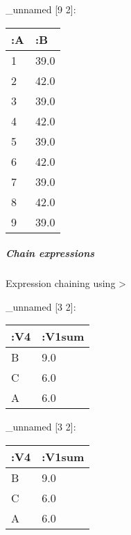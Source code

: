 \documentclass[]{article}
\newenvironment{Shaded}{\begin{snugshade}}{\end{snugshade}}
\newcommand{\AttributeTok}[1]{\textcolor[rgb]{0.77,0.63,0.00}{#1}}
\newcommand{\DecValTok}[1]{\textcolor[rgb]{0.00,0.00,0.81}{#1}}
\newcommand{\KeywordTok}[1]{\textcolor[rgb]{0.13,0.29,0.53}{\textbf{#1}}}
\newcommand{\NormalTok}[1]{#1}
\newcommand{\VariableTok}[1]{\textcolor[rgb]{0.00,0.00,0.00}{#1}}
\let\oldsubparagraph\subparagraph
\renewcommand{\subparagraph}[1]{\oldsubparagraph{#1}\mbox{}}
\begin{document}
\_unnamed {[}9 2{]}:

\begin{longtable}[]{@{}ll@{}}
\toprule
:A & :B\tabularnewline
\midrule
\endhead
1 & 39.0\tabularnewline
2 & 42.0\tabularnewline
3 & 39.0\tabularnewline
4 & 42.0\tabularnewline
5 & 39.0\tabularnewline
6 & 42.0\tabularnewline
7 & 39.0\tabularnewline
8 & 42.0\tabularnewline
9 & 39.0\tabularnewline
\bottomrule
\end{longtable}

\hypertarget{chain-expressions}{%
\subparagraph{Chain expressions}\label{chain-expressions}}

Expression chaining using \textgreater{}

\begin{Shaded}
\end{Shaded}

\_unnamed {[}3 2{]}:

\begin{longtable}[]{@{}ll@{}}
\toprule
:V4 & :V1sum\tabularnewline
\midrule
\endhead
B & 9.0\tabularnewline
C & 6.0\tabularnewline
A & 6.0\tabularnewline
\bottomrule
\end{longtable}

\begin{Shaded}
\end{Shaded}

\_unnamed {[}3 2{]}:

\begin{longtable}[]{@{}ll@{}}
\toprule
:V4 & :V1sum\tabularnewline
\midrule
\endhead
B & 9.0\tabularnewline
C & 6.0\tabularnewline
A & 6.0\tabularnewline
\bottomrule
\end{longtable}
\end{document}
